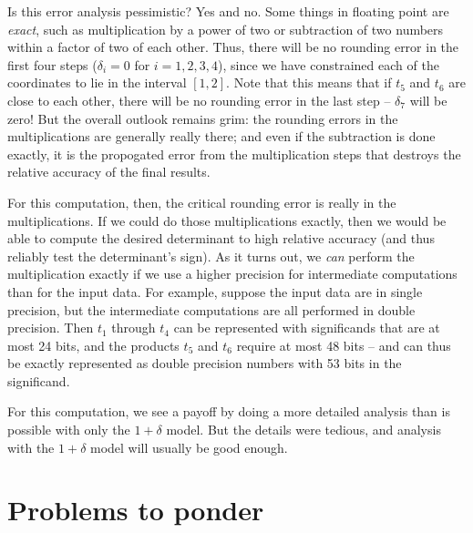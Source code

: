 \documentclass[12pt, leqno]{article}
\begin{document}
Is this error analysis pessimistic?  Yes and no.  Some things in
floating point are {\em exact}, such as multiplication by a power of
two or subtraction of two numbers within a factor of two of each
other.  Thus, there will be no rounding error in the first four steps
($\delta_i = 0$ for $i = 1, 2, 3, 4$), since we have constrained each
of the coordinates to lie in the interval $[1,2]$.  Note that this
means that if $t_5$ and $t_6$ are close to each other, there will be
no rounding error in the last step -- $\delta_7$ will be zero!  But
the overall outlook remains grim: the rounding errors in the
multiplications are generally really there; and even if the
subtraction is done exactly, it is the propogated error from the
multiplication steps that destroys the relative accuracy of the final
results.

For this computation, then, the critical rounding error is really in
the multiplications.  If we could do those multiplications exactly,
then we would be able to compute the desired determinant to high relative 
accuracy (and thus reliably test the determinant's sign).  As it turns
out, we {\em can} perform the multiplication exactly if we use a higher
precision for intermediate computations than for the input data.
For example, suppose the input data are in single precision, but the
intermediate computations are all performed in double precision.
Then  $t_1$ through $t_4$ can be represented with significands that are at most
24 bits, and the products $t_5$ and $t_6$ require at most 48 bits --
and can thus be exactly represented as double precision numbers with
53 bits in the significand.

For this computation, we see a payoff by doing a more detailed analysis
than is possible with only the $1+\delta$ model.  But the details
were tedious, and analysis with the $1+\delta$ model will usually
be good enough.

\section*{Problems to ponder}
\end{document}
